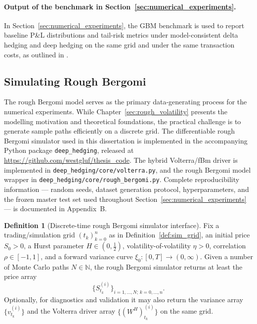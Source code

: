 \documentclass[12pt,a4paper]{article}
\theoremstyle{definition}
\newtheorem{definition}{Definition}[section]
\theoremstyle{plain}
\theoremstyle{remark}
\theoremstyle{plain}
\begin{document}
\paragraph{Output of the benchmark in Section~\ref{sec:numerical_experiments}.}
In Section~\ref{sec:numerical_experiments}, the GBM benchmark is used to report baseline P\&L distributions and tail-risk metrics under model-consistent delta hedging and deep hedging on the same grid and under the same transaction costs, as outlined in \cite{Buehler2019DeepHedging}.

\subsection{Simulating Rough Bergomi}
\label{subsec:rb_sim}

The rough Bergomi model serves as the primary data-generating process for the numerical experiments.
While Chapter~\ref{sec:rough_volatility} presents the modelling motivation and theoretical foundations, the practical challenge is to generate sample paths efficiently on a discrete grid. The differentiable rough Bergomi simulator used in this dissertation is implemented in the accompanying Python package \texttt{deep\_hedging}, released at \url{https://github.com/westgluf/thesis_code}. The hybrid Volterra/fBm driver is implemented in \texttt{deep\_hedging/core/volterra.py}, and the rough Bergomi model wrapper in \texttt{deep\_hedging/core/rough\_bergomi.py}. Complete reproducibility information --- random seeds, dataset generation protocol, hyperparameters, and the frozen master test set used throughout Section~\ref{sec:numerical_experiments} --- is documented in Appendix~B.

\begin{definition}[Discrete-time rough Bergomi simulator interface]
\label{def:rb_sim_interface}
Fix a trading/simulation grid $(t_k)_{k=0}^n$ as in Definition~\ref{def:sim_grid}, an initial price $S_0>0$, a Hurst parameter $H\in(0,\tfrac12)$, volatility-of-volatility $\eta>0$, correlation $\rho\in[-1,1]$, and a forward variance curve $\xi_0:[0,T]\to(0,\infty)$.
Given a number of Monte Carlo paths $N\in\mathbb{N}$, the rough Bergomi simulator returns at least the price array
\[
\bigl\{S^{(i)}_{t_k}\bigr\}_{i=1,\dots,N;\,k=0,\dots,n}.
\]
Optionally, for diagnostics and validation it may also return the variance array $\{v^{(i)}_{t_k}\}$ and the Volterra driver array $\{(W^{H})^{(i)}_{t_k}\}$ on the same grid.
\end{definition}
\end{document}
